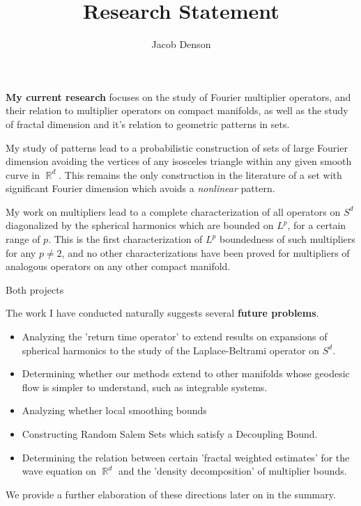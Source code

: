 \documentclass[12pt]{article}
\title{Research Statement}
\author{Jacob Denson}
\date{}
\DeclareMathOperator{\RR}{\mathbb{R}}
\begin{document}
\maketitle

{\bf My current research} focuses on the study of Fourier multiplier operators, and their relation to multiplier operators on compact manifolds, as well as the study of fractal dimension and it's relation to geometric patterns in sets.

My study of patterns lead to a probabilistic construction of sets of large Fourier dimension avoiding the vertices of any isosceles triangle within any given smooth curve in $\RR^d$. This remains the only construction in the literature of a set with significant Fourier dimension which avoids a \emph{nonlinear} pattern.

My work on multipliers lead to a complete characterization of all operators on $S^d$ diagonalized by the spherical harmonics which are bounded on $L^p$, for a certain range of $p$. This is the first characterization of $L^p$ boundedness of such multipliers for any $p \neq 2$, and no other characterizations have been proved for multipliers of analogous operators on any other compact manifold.

Both projects 

The work I have conducted naturally suggests several {\bf future problems}.
%
\begin{itemize}
	\item Analyzing the 'return time operator' to extend results on expansions of spherical harmonics to the study of the Laplace-Beltrami operator on $S^d$.

	\item Determining whether our methods extend to other manifolds whose geodesic flow is simpler to understand, such as integrable systems.

	\item Analyzing whether local smoothing bounds

	\item Constructing Random Salem Sets which satisfy a Decoupling Bound.

	\item Determining the relation between certain 'fractal weighted estimates' for the wave equation on $\RR^d$ and the 'density decomposition' of multiplier bounds.
\end{itemize}
%
We provide a further elaboration of these directions later on in the summary.
\end{document}

